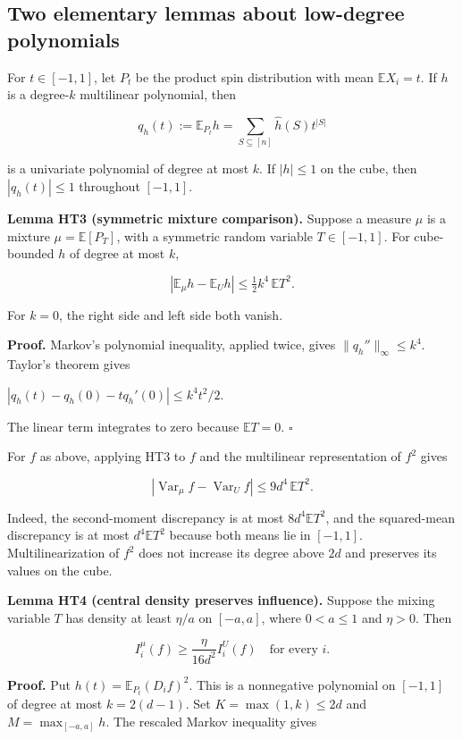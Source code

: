 \subsection{Two elementary lemmas about low-degree polynomials}\label{ht:two-elementary-lemmas-about-low-degree-polynomials}

For \(t \in [-1,1]\), let \(P_t\) be the product spin distribution with mean \(\mathbb E X_i=t\). If \(h\) is a degree-\(k\) multilinear polynomial, then

\[
q_h(t):=\mathbb E_{P_t}h
=\sum_{S\subseteq[n]}\widehat h(S)t^{|S|}
\]

is a univariate polynomial of degree at most \(k\). If \(|h|\le 1\) on the cube, then \(|q_h(t)|\le 1\) throughout \([-1,1]\).

\textbf{Lemma HT3 (symmetric mixture comparison).} Suppose a measure \(\mu\) is a mixture \(\mu=\mathbb E[P_T]\), with a symmetric random variable \(T \in [-1,1]\). For cube-bounded \(h\) of degree at most \(k\),

\[
|\mathbb E_\mu h-\mathbb E_Uh|
\le \tfrac12 k^4\,\mathbb E T^2.
\tag{HT3}
\]

For \(k=0\), the right side and left side both vanish.

\textbf{Proof.} Markov's polynomial inequality, applied twice, gives \(\lVert q_h''\rVert_\infty\le k^4\). Taylor's theorem gives

\(|q_h(t)-q_h(0)-t q_h'(0)| \le  k^4 t^2/2\).

The linear term integrates to zero because \(\mathbb E T=0\). \(\square\)

For \(f\) as above, applying HT3 to \(f\) and the multilinear representation of \(f^2\) gives

\[
|\operatorname{Var}_\mu f-\operatorname{Var}_U f|
\le 9d^4\,\mathbb E T^2.
\tag{4.1}
\]

Indeed, the second-moment discrepancy is at most \(8 d^4 \mathbb E T^2\), and the squared-mean discrepancy is at most \(d^4 \mathbb E T^2\) because both means lie in \([-1,1]\). Multilinearization of \(f^2\) does not increase its degree above \(2d\) and preserves its values on the cube.

\textbf{Lemma HT4 (central density preserves influence).} Suppose the mixing variable \(T\) has density at least \(\eta/a\) on \([-a,a]\), where \(0<a\le 1\) and \(\eta>0\). Then

\[
I_i^\mu(f)\ge \frac{\eta}{16d^2}I_i^U(f)
\quad\text{for every }i.
\tag{HT4}
\]

\textbf{Proof.} Put \(h(t)=\mathbb E_{P_t}(D_i f)^2\). This is a nonnegative polynomial on \([-1,1]\) of degree at most \(k=2(d-1)\). Set \(K=\max(1,k)\le 2d\) and \(M=\max_{[-a,a]}h\). The rescaled Markov inequality gives

